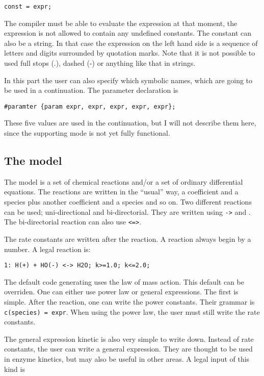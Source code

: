 \begin{verbatim}
const = expr;
\end{verbatim}

The compiler must be able to evaluate the expression at that moment,
\ie the expression is not allowed to contain any undefined constants.
The constant can also be a string. In that case the expression on the
left hand side is a sequence of letters and digits surrounded by
quotation marks. Note that it is not possible to used full stops (.),
dashed (-) or anything like that in strings.

In this part the user can also specify which symbolic names, which are
going to be used in a continuation. The parameter declaration is

\begin{verbatim}
#paramter {param expr, expr, expr, expr, expr};
\end{verbatim}

These five values are used in the continuation, but I will not
describe them here, since the supporting mode is not yet fully functional.

\subsection{The model}
\label{model}
The model is a set of chemical reactions and/or a set of ordinary
differential equations. The reactions are written in the
``usual'' way, \ie a coefficient and a species plus another coefficient and 
a species and so on. Two different reactions can be used; uni-directional and 
bi-directorial. They are written using {\tt ->} and {\tt <->}. The 
bi-directorial reaction can also use {\tt <=>}. 

The rate constants are written after the reaction. A reaction always
begin by a number. A legal reaction is:

\begin{verbatim}    
1: H(+) + HO(-) <-> H2O; k>=1.0; k<=2.0;
\end{verbatim}

The default code generating uses the law of mass action. This default can 
be overriden. One can either use power law or general expressions. The
first is simple. After the reaction, one can write the power constants. Their
grammar is {\tt c(species) = expr}. When using the power law, the user must
still write the rate constants.

The general expression kinetic is also very simple to write down. Instead of
rate constants, the user can write a general expression. They are
thought to be used in enzyme kinetics, but may also be useful in other
areas. A legal input of this kind is 

